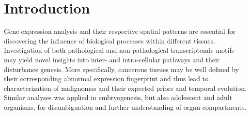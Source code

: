 \documentclass[]{article}
\renewcommand{\cite}{\citep}
\begin{document}
%	
%	
%	
%
%

\thispagestyle{empty}
\listoffigures
\newpage
\listoftables
\newpage
{}

\section{Introduction}
\label{sec:introduction}
Gene expression analysis and their respective spatial patterns are essential for discovering the influence of biological processes within different tissues. Investigation of both pathological and non-pathological transcriptomic motifs may yield novel insights into inter- and intra-cellular pathways and their disturbance genesis. 
More specifically, cancerous tissues may be well defined by their corresponding abnormal expression fingerprint and thus lead to characterization of malignomas and their expected priors and temporal evolution. Similar analyses was applied in embryogenesis, but also adolescent and adult organisms, for disambiguation and further understanding of organ compartments.\\
\end{document}
